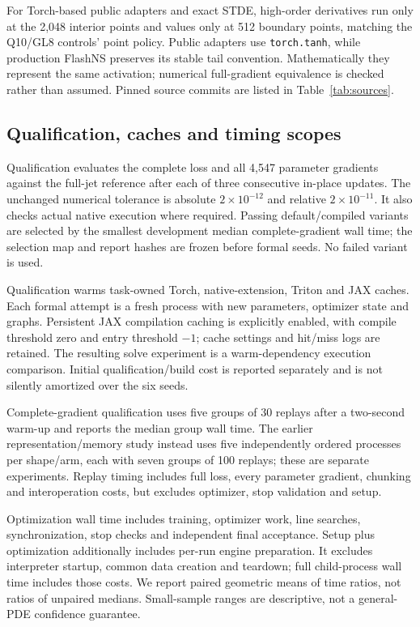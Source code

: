 \documentclass[11pt]{article}
\begin{document}
For Torch-based public adapters and exact STDE, high-order derivatives run
only at the 2,048 interior points and values only at 512 boundary points,
matching the Q10/GL8 controls' point policy. Public adapters use
\texttt{torch.tanh}, while production FlashNS preserves its stable tail
convention. Mathematically they represent the same activation; numerical
full-gradient equivalence is checked rather than assumed. Pinned source
commits are listed in Table~\ref{tab:sources}.

\subsection{Qualification, caches and timing scopes}
Qualification evaluates the complete loss and all 4,547 parameter gradients
against the full-jet reference after each of three consecutive in-place
updates. The unchanged numerical tolerance is absolute $2\times10^{-12}$
and relative $2\times10^{-11}$. It also checks actual native execution where
required. Passing default/compiled variants are selected by the smallest
development median complete-gradient wall time; the selection map and
report hashes are frozen before formal seeds. No failed variant is used.

Qualification warms task-owned Torch, native-extension, Triton and JAX
caches. Each formal attempt is a fresh process with new parameters,
optimizer state and graphs. Persistent JAX compilation caching is explicitly
enabled, with compile threshold zero and entry threshold $-1$; cache
settings and hit/miss logs are retained. The resulting solve experiment is
a warm-dependency execution comparison. Initial qualification/build cost
is reported separately and is not silently amortized over the six seeds.

Complete-gradient qualification uses five groups of 30 replays after a
two-second warm-up and reports the median group wall time. The earlier
representation/memory study instead uses five independently ordered
processes per shape/arm, each with seven groups of 100 replays; these are
separate experiments. Replay timing includes full loss, every parameter
gradient, chunking and interoperation costs, but excludes optimizer, stop
validation and setup.

Optimization wall time includes training, optimizer work, line searches,
synchronization, stop checks and independent final acceptance. Setup plus
optimization additionally includes per-run engine preparation. It excludes
interpreter startup, common data creation and teardown; full child-process
wall time includes those costs. We report paired geometric means of time
ratios, not ratios of unpaired medians. Small-sample ranges are descriptive,
not a general-PDE confidence guarantee.
\end{document}
